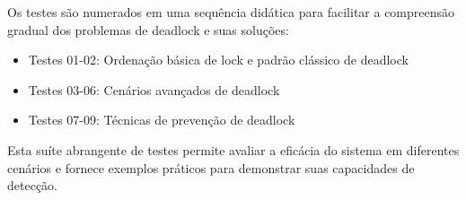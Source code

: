 Os testes são numerados em uma sequência didática para facilitar a compreensão gradual dos problemas de deadlock e suas soluções:
\begin{itemize}
    \item Testes 01-02: Ordenação básica de lock e padrão clássico de deadlock
    \item Testes 03-06: Cenários avançados de deadlock
    \item Testes 07-09: Técnicas de prevenção de deadlock
\end{itemize}

Esta suíte abrangente de testes permite avaliar a eficácia do sistema em diferentes cenários e fornece exemplos práticos para demonstrar suas capacidades de detecção.
